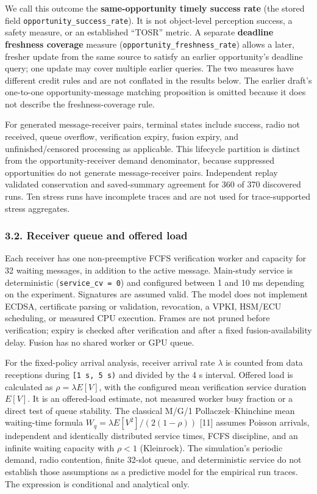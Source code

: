 \documentclass[
]{article}
\begin{document}
We call this outcome the \textbf{same-opportunity timely success rate}
(the stored field \texttt{opportunity\_success\_rate}). It is not
object-level perception success, a safety measure, or an established
``TOSR'' metric. A separate \textbf{deadline freshness coverage} measure
(\texttt{opportunity\_freshness\_rate}) allows a later, fresher update
from the same source to satisfy an earlier opportunity's deadline query;
one update may cover multiple earlier queries. The two measures have
different credit rules and are not conflated in the results below. The
earlier draft's one-to-one opportunity-message matching proposition is
omitted because it does not describe the freshness-coverage rule.

For generated message-receiver pairs, terminal states include success,
radio not received, queue overflow, verification expiry, fusion expiry,
and unfinished/censored processing as applicable. This lifecycle
partition is distinct from the opportunity-receiver demand denominator,
because suppressed opportunities do not generate message-receiver pairs.
Independent replay validated conservation and saved-summary agreement
for 360 of 370 discovered runs. Ten stress runs have incomplete traces
and are not used for trace-supported stress aggregates.

\subsubsection{3.2. Receiver queue and offered
load}\label{receiver-queue-and-offered-load}

Each receiver has one non-preemptive FCFS verification worker and
capacity for 32 waiting messages, in addition to the active message.
Main-study service is deterministic (\texttt{service\_cv\ =\ 0}) and
configured between 1 and 10 ms depending on the experiment. Signatures
are assumed valid. The model does not implement ECDSA, certificate
parsing or validation, revocation, a VPKI, HSM/ECU scheduling, or
measured CPU execution. Frames are not pruned before verification;
expiry is checked after verification and after a fixed
fusion-availability delay. Fusion has no shared worker or GPU queue.

For the fixed-policy arrival analysis, receiver arrival rate \(\lambda\)
is counted from data receptions during \texttt{{[}1\ s,\ 5\ s)} and
divided by the 4 s interval. Offered load is calculated as
\(\rho=\lambda E[V]\), with the configured mean verification service
duration \(E[V]\). It is an offered-load estimate, not measured worker
busy fraction or a direct test of queue stability. The classical M/G/1
Pollaczek--Khinchine mean waiting-time formula
\(W_q=\lambda E[V^2]/(2(1-\rho))\) {[}11{]} assumes Poisson arrivals,
independent and identically distributed service times, FCFS discipline,
and an infinite waiting capacity with \(\rho<1\) (Kleinrock). The
simulation's periodic demand, radio contention, finite 32-slot queue,
and deterministic service do not establish those assumptions as a
predictive model for the empirical run traces. The expression is
conditional and analytical only.
\end{document}
